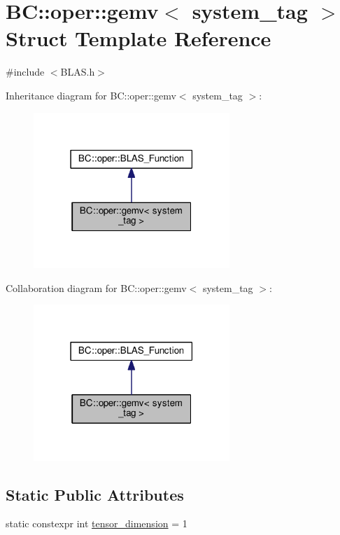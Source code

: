 \hypertarget{structBC_1_1oper_1_1gemv}{}\section{BC\+:\+:oper\+:\+:gemv$<$ system\+\_\+tag $>$ Struct Template Reference}
\label{structBC_1_1oper_1_1gemv}


{\ttfamily \#include $<$B\+L\+A\+S.\+h$>$}



Inheritance diagram for BC\+:\+:oper\+:\+:gemv$<$ system\+\_\+tag $>$\+:
\nopagebreak
\begin{figure}[H]
\begin{center}
\leavevmode
\includegraphics[width=210pt]{structBC_1_1oper_1_1gemv__inherit__graph}
\end{center}
\end{figure}


Collaboration diagram for BC\+:\+:oper\+:\+:gemv$<$ system\+\_\+tag $>$\+:
\nopagebreak
\begin{figure}[H]
\begin{center}
\leavevmode
\includegraphics[width=210pt]{structBC_1_1oper_1_1gemv__coll__graph}
\end{center}
\end{figure}
\subsection*{Static Public Attributes}
\begin{DoxyCompactItemize}
\item 
static constexpr int \hyperlink{structBC_1_1oper_1_1gemv_a7d2defce6bbc1855c0557985a6804991}{tensor\+\_\+dimension} = 1
\end{DoxyCompactItemize}


